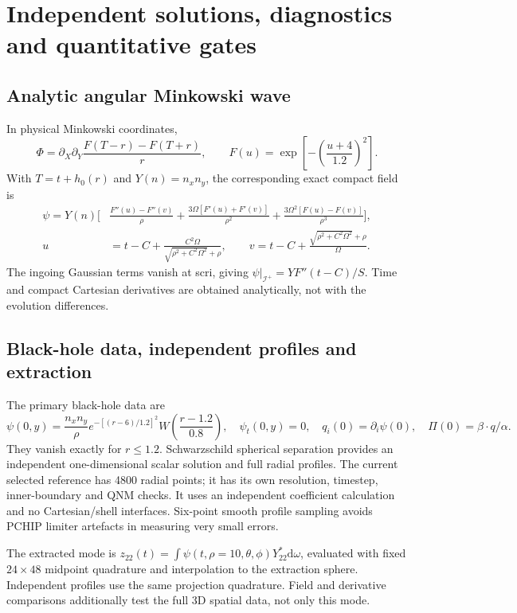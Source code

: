 \documentclass[11pt,letterpaper]{article}
\newcommand{\scri}{\mathscr{I}^{+}}
\newcommand{\dd}{\mathrm{d}}
\begin{document}
\clearpage
\section{Independent solutions, diagnostics and quantitative gates}
\subsection{Analytic angular Minkowski wave}
In physical Minkowski coordinates,
\begin{equation}
 \Phi=\partial_X\partial_Y\frac{F(T-r)-F(T+r)}r,\qquad
 F(u)=\exp\left[-\left(\frac{u+4}{1.2}\right)^2\right].
\end{equation}
With $T=t+h_0(r)$ and $Y(n)=n_xn_y$, the corresponding exact compact field is
\begin{align}
 \psi=Y(n)\bigg[&\frac{F''(u)-F''(v)}\rho
 +\frac{3\Omega[F'(u)+F'(v)]}{\rho^2}
 +\frac{3\Omega^2[F(u)-F(v)]}{\rho^3}\bigg],\\
 u&=t-C+\frac{C^2\Omega}{\sqrt{\rho^2+C^2\Omega^2}+\rho},\qquad
 v=t-C+\frac{\sqrt{\rho^2+C^2\Omega^2}+\rho}{\Omega}.
\end{align}
The ingoing Gaussian terms vanish at scri, giving $\psi|_{\scri}=YF''(t-C)/S$. Time and compact Cartesian derivatives are obtained analytically, not with the evolution differences.

\subsection{Black-hole data, independent profiles and extraction}
The primary black-hole data are
\begin{equation}
 \psi(0,y)=\frac{n_xn_y}{\rho}e^{-[(r-6)/1.2]^2}W\!\left(\frac{r-1.2}{0.8}\right),\quad
 \psi_t(0,y)=0,\quad q_i(0)=\partial_i\psi(0),\quad \Pi(0)=\beta\cdot q/\alpha.
\end{equation}
They vanish exactly for $r\leq1.2$. Schwarzschild spherical separation provides an independent one-dimensional scalar solution and full radial profiles. The current selected reference has 4800 radial points; it has its own resolution, timestep, inner-boundary and QNM checks. It uses an independent coefficient calculation and no Cartesian/shell interfaces. Six-point smooth profile sampling avoids PCHIP limiter artefacts in measuring very small errors.

The extracted mode is $z_{22}(t)=\int\psi(t,\rho=10,\theta,\phi)Y_{22}^*\dd\omega$, evaluated with fixed $24\times48$ midpoint quadrature and interpolation to the extraction sphere. Independent profiles use the same projection quadrature. Field and derivative comparisons additionally test the full 3D spatial data, not only this mode.
\end{document}
